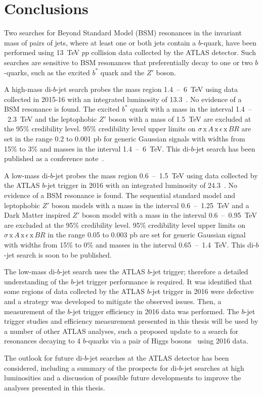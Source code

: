 \chapter{Conclusions}
\label{sec:conc}

Two searches for Beyond Standard Model (BSM) resonances in the invariant mass of pairs of jets,
where at least one or both jets contain a $b$-quark,
have been performed using 13~TeV $pp$ collision data collected by the ATLAS detector.
Such searches are sensitive to BSM resonances that preferentially decay to one or two $b$-quarks, such as the excited $b^*$ quark and the $Z'$ boson.


A high-mass di-$b$-jet search probes the mass region 1.4~--~6~TeV
using data collected in 2015-16 with an integrated luminosity of 13.3~\ifb{}.
No evidence of a BSM resonance is found.
The excited $b^*$ quark with a mass in the interval 1.4~--~2.3~TeV
and the leptophobic $Z'$ boson with a mass of 1.5~TeV are excluded at the 95\% credibility level.
95\% credibility level upper limits on $\sigma\,\text{x}\,\mathit{A}\,\text{x}\,\epsilon\,\text{x}\,\mathit{BR}$
are set in the range 0.2 to 0.001 pb for generic Gaussian signals with widths from 15\% to 3\% and masses in the interval 1.4~--~6~TeV.
This di-$b$-jet search has been published as a conference note~\cite{dibjet-ichep_conf}.

A low-mass di-$b$-jet probes the mass region 0.6~--~1.5~TeV
using data collected by the ATLAS $b$-jet trigger in 2016 with an integrated luminosity of 24.3~\ifb{}.
No evidence of a BSM resonance is found.
The sequential standard model and leptophobic $Z'$  boson models with a mass in the interval 0.6~--~1.25~TeV
and a Dark Matter inspired $Z'$ boson model with a mass in the interval 0.6~--~0.95~TeV are excluded at the 95\% credibility level.
95\% credibility level upper limits on $\sigma\,\text{x}\,\mathit{A}\,\text{x}\,\epsilon\,\text{x}\,\mathit{BR}$ in the range 0.05 to 0.003 pb
are set for generic Gaussian signal with widths from 15\% to 0\% and masses in the interval 0.65~--~1.4~TeV.
This di-$b$-jet search is soon to be published.

The low-mass di-$b$-jet search uses the ATLAS $b$-jet trigger; therefore a detailed understanding of the $b$-jet trigger performance is required.
It was identified that some regions of data collected by the ATLAS $b$-jet trigger in 2016 were defective
and a strategy was developed to mitigate the observed issues.
Then, a measurement of the $b$-jet trigger efficiency in 2016 data was performed.
The $b$-jet trigger studies and efficiency measurement presented in this thesis will be used by a number of other ATLAS analyses,
such a proposed update to a search for resonances decaying to 4 $b$-quarks via a pair of Higgs bosons~\cite{trig-H4b} using 2016 data.

The outlook for future di-$b$-jet searches at the ATLAS detector has been considered,
including a summary of the prospects for di-$b$-jet searches at high luminosities
and a discussion of possible future developments to improve the analyses presented in this thesis.


